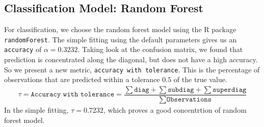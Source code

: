 \documentclass[8pt]{report}
\begin{document}
\subsection{Classification Model: Random Forest}
For classification, we choose the random forest model using the R package \texttt{randomForest}.
The simple fitting using the default parameters gives us an \texttt{accuracy} of $\alpha = 0.3232$. 
Taking look at the confusion matrix, we found that prediction is concentrated along the diagonal, 
but does not have a high accuracy. So we present a new metric, \texttt{accuracy with tolerance}. 
This is the percentage of observations that are predicted within a tolerance $0.5$ of the true value.
{\small
\begin{align*}
    \tau = \texttt{Accuracy with tolerance} = \dfrac{\sum \texttt{diag} + \sum \texttt{subdiag} + \sum \texttt{superdiag}}{\sum \texttt{Observations}}
\end{align*}
}
In the simple fitting, $\tau = 0.7232$, which proves a good concentrtion of random forest model. 
\end{document}
